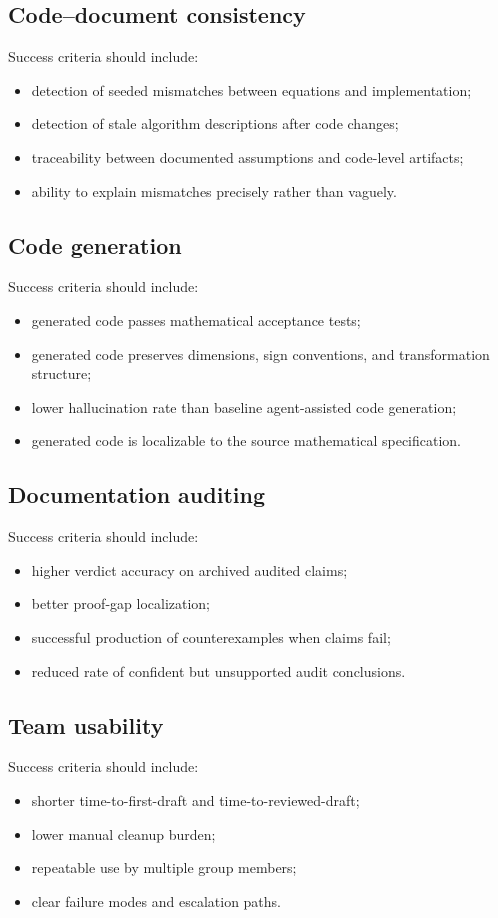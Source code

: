 \subsection{Code--document consistency}
Success criteria should include:
\begin{itemize}
  \item detection of seeded mismatches between equations and implementation;
  \item detection of stale algorithm descriptions after code changes;
  \item traceability between documented assumptions and code-level artifacts;
  \item ability to explain mismatches precisely rather than vaguely.
\end{itemize}

\subsection{Code generation}
Success criteria should include:
\begin{itemize}
  \item generated code passes mathematical acceptance tests;
  \item generated code preserves dimensions, sign conventions, and transformation structure;
  \item lower hallucination rate than baseline agent-assisted code generation;
  \item generated code is localizable to the source mathematical specification.
\end{itemize}

\subsection{Documentation auditing}
Success criteria should include:
\begin{itemize}
  \item higher verdict accuracy on archived audited claims;
  \item better proof-gap localization;
  \item successful production of counterexamples when claims fail;
  \item reduced rate of confident but unsupported audit conclusions.
\end{itemize}

\subsection{Team usability}
Success criteria should include:
\begin{itemize}
  \item shorter time-to-first-draft and time-to-reviewed-draft;
  \item lower manual cleanup burden;
  \item repeatable use by multiple group members;
  \item clear failure modes and escalation paths.
\end{itemize}


